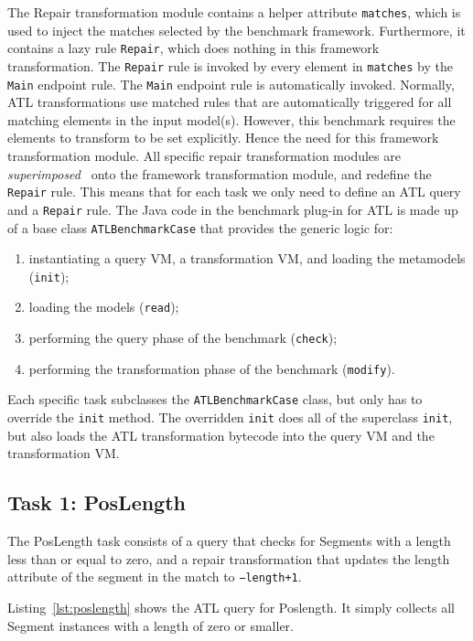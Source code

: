 \documentclass[submission,copyright,creativecommons]{eptcs}
\begin{document}
The Repair transformation module contains a helper attribute \texttt{matches}, which is used to inject the matches selected by the benchmark framework. Furthermore, it contains a lazy rule \texttt{Repair}, which does nothing in this framework transformation. The \texttt{Repair} rule is invoked by every element in \texttt{matches} by the \texttt{Main} endpoint rule. The \texttt{Main} endpoint rule is automatically invoked. Normally, ATL transformations use matched rules that are automatically triggered for all matching elements in the input model(s). However, this benchmark requires the elements to transform to be set explicitly. Hence the need for this framework transformation module. All specific repair transformation modules are \emph{superimposed}~\cite{journal/sosym/Wagelaar2009} onto the framework transformation module, and redefine the \texttt{Repair} rule. This means that for each task we only need to define an ATL query and a \texttt{Repair} rule. The Java code in the benchmark plug-in for ATL is made up of a base class \texttt{ATLBenchmarkCase} that provides the generic logic for:

\begin{enumerate}
\item instantiating a query VM, a transformation VM, and loading the metamodels (\texttt{init});
\item loading the models (\texttt{read});
\item performing the query phase of the benchmark (\texttt{check});
\item performing the transformation phase of the benchmark (\texttt{modify}).
\end{enumerate}

Each specific task subclasses the \texttt{ATLBenchmarkCase} class, but only has to override the \texttt{init} method. The overridden \texttt{init} does all of the superclass \texttt{init}, but also loads the ATL transformation bytecode into the query VM and the transformation VM.

\subsection{Task 1: PosLength}

The PosLength task consists of a query that checks for Segments with a length less than or equal to zero, and a repair transformation that updates the length attribute of the segment in the match to \texttt{−length+1}. 

Listing~\ref{lst:poslength} shows the ATL query for Poslength. It simply collects all Segment instances with a length of zero or smaller.
\end{document}
